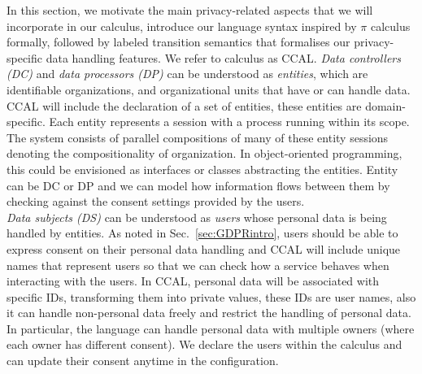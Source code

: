 In this section, we motivate the main privacy-related aspects that we will incorporate in our calculus, introduce our language syntax inspired by $ \pi$ calculus formally, followed by labeled transition semantics that formalises our privacy-specific data handling features. We refer to calculus as CCAL. 
\emph{Data controllers (DC)} and \emph{data processors (DP)} can be understood as \emph{entities}, which are identifiable organizations, and organizational units that have or can handle data. CCAL will include the declaration of a set of entities, these entities are domain-specific. Each entity represents a session with a process running within its scope. 
The system consists of parallel compositions of many of these entity sessions denoting the compositionality of organization. In object-oriented programming, this could be envisioned as interfaces or classes abstracting the entities. 
Entity can be DC or DP and we can model how information flows between them by checking against the consent settings provided by the users.\\
\emph{Data subjects (DS)} can be understood as \emph{users} whose personal data is being handled by 
 entities. As noted in Sec.~\ref{sec:GDPRintro}, 
users should be able to express consent on their personal data handling and
CCAL will include unique names that represent users so that we can check how a service behaves when interacting with the users. In CCAL, personal data will be associated with specific IDs, transforming them into private values, these IDs are user names, also it can handle non-personal data freely and restrict the handling of personal data. In particular, the language can handle personal data with multiple owners (where each owner has different consent).%
We declare the users within the calculus and can update their consent anytime in the configuration. 

